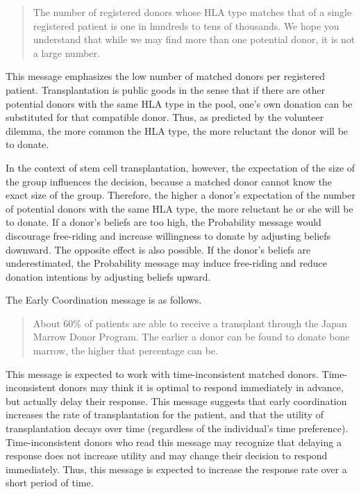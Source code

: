 \documentclass[
]{article}
\begin{document}
\begin{quote}
The number of registered donors whose HLA type matches that of a single registered patient is one in hundreds to tens of thousands. We hope you understand that while we may find more than one potential donor, it is not a large number.
\end{quote}

This message emphasizes the low number of matched donors per registered patient. Transplantation is public goods in the sense that if there are other potential donors with the same HLA type in the pool, one's own donation can be substituted for that compatible donor. Thus, as predicted by the volunteer dilemma, the more common the HLA type, the more reluctant the donor will be to donate.

In the context of stem cell transplantation, however, the expectation of the size of the group influences the decision, because a matched donor cannot know the exact size of the group. Therefore, the higher a donor's expectation of the number of potential donors with the same HLA type, the more reluctant he or she will be to donate. If a donor's beliefs are too high, the Probability message would discourage free-riding and increase willingness to donate by adjusting beliefs downward. The opposite effect is also possible. If the donor's beliefs are underestimated, the Probability message may induce free-riding and reduce donation intentions by adjusting beliefs upward.

The Early Coordination message is as follows.

\begin{quote}
About 60\% of patients are able to receive a transplant through the Japan Marrow Donor Program. The earlier a donor can be found to donate bone marrow, the higher that percentage can be.
\end{quote}

This message is expected to work with time-inconsistent matched donors. Time-inconsistent donors may think it is optimal to respond immediately in advance, but actually delay their response. This message suggests that early coordination increases the rate of transplantation for the patient, and that the utility of transplantation decays over time (regardless of the individual's time preference). Time-inconsistent donors who read this message may recognize that delaying a response does not increase utility and may change their decision to respond immediately. Thus, this message is expected to increase the response rate over a short period of time.
\end{document}
